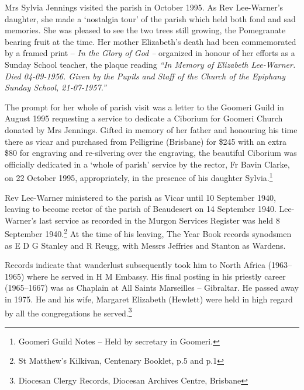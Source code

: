 Mrs Sylvia Jennings visited the parish in October 1995. As Rev Lee-Warner's daughter, she made a `nostalgia tour' of the parish which held both fond and sad memories. She was pleased to see the two trees still growing, the Pomegranate bearing fruit at the time. Her mother Elizabeth's death had been commemorated by a framed print -- \emph{In the Glory of God --} organized in honour of her efforts as a Sunday School teacher, the plaque reading \emph{``In Memory of Elizabeth Lee-Warner. Died 04-09-1956. Given by the Pupils and Staff of the Church of the Epiphany Sunday School, 21-07-1957.''}



The prompt for her whole of parish visit was a letter to the Goomeri Guild in August 1995 requesting a service to dedicate a Ciborium for Goomeri Church donated by Mrs Jennings. Gifted in memory of her father and honouring his time there as vicar and purchased from Pelligrine (Brisbane) for \$245 with an extra \$80 for engraving and re-silvering over the engraving, the beautiful Ciborium was officially dedicated in a `whole of parish' service by the rector, Fr Bavin Clarke, on 22 October 1995, appropriately, in the presence of his daughter Sylvia.\footnote{Goomeri Guild Notes -- Held by secretary in Goomeri.}


\balance


Rev Lee-Warner ministered to the parish as Vicar until 10 September 1940, leaving to become rector of the parish of Beaudesert on 14 September 1940. Lee-Warner's last service as recorded in the Murgon Services Register was held 8 September 1940.\footnote{St Matthew's Kilkivan, Centenary Booklet, p.5 and p.1} At the time of his leaving, The Year Book records synodsmen as E D G Stanley and R Reugg, with Messrs Jeffries and Stanton as Wardens.


Records indicate that wanderlust subsequently took him to North Africa (1963--1965) where he served in H M Embassy. His final posting in his priestly career (1965--1667) was as Chaplain at All Saints Marseilles -- Gibraltar. He passed away in 1975. He and his wife, Margaret Elizabeth (Hewlett) were held in high regard by all the congregations he served.\footnote{Diocesan Clergy Records, Diocesan Archives Centre, Brisbane}


\printendnotes[custom]
\setcounter{endnote}{0}





